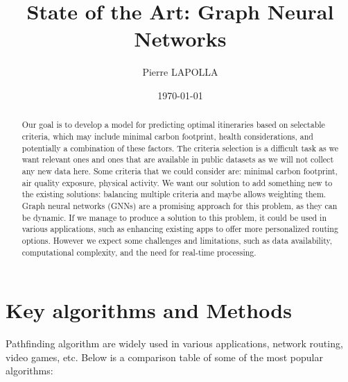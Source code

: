 \documentclass[10pt]{article}
\title{State of the Art: Graph Neural Networks}
\author{Pierre LAPOLLA}
\date{\today}
\begin{document}
    \maketitle
    \tableofcontents

    \newpage
    \begin{abstract}
        Our goal is to develop a model for predicting optimal itineraries based on selectable criteria, which may include minimal carbon footprint, health considerations, and potentially a combination of these factors.
        The criteria selection is a difficult task as we want relevant ones and ones that are available in public datasets as we will not collect any new data here.
        Some criteria that we could consider are: minimal carbon footprint, air quality exposure, physical activity.
        We want our solution to add something new to the existing solutions: balancing multiple criteria and maybe allows weighting them.
        Graph neural networks (GNNs) are a promising approach for this problem, as they can be dynamic.
        If we manage to produce a solution to this problem, it could be used in various applications, such as enhancing existing apps to offer more personalized routing options.
        However we expect some challenges and limitations, such as data availability, computational complexity, and the need for real-time processing.
    \end{abstract}


    \section{Key algorithms and Methods}\label{sec:key-algorithms-and-methods}
    Pathfinding algorithm are widely used in various applications, network routing, video games, etc.
    Below is a comparison table of some of the most popular algorithms:
\end{document}
